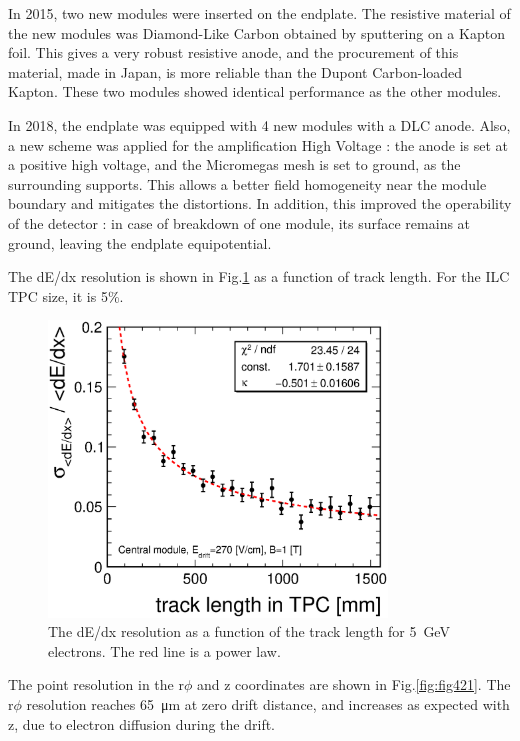 In 2015, two new modules were inserted on the endplate. The resistive material of the new
modules was Diamond-Like Carbon obtained by sputtering on a Kapton foil.
This gives a very robust resistive anode, and the procurement of this material, made in Japan, is more reliable
than the Dupont Carbon-loaded Kapton. These two modules showed identical performance as the other modules.

In 2018, the endplate was equipped with 4 new modules with a DLC anode. Also, a new scheme was applied for the amplification High Voltage : the anode is set at a positive high voltage, and the Micromegas mesh is set to ground, as the surrounding supports. This allows a better field homogeneity near the module boundary and mitigates the distortions. In addition, this improved the operability of the detector : in case of breakdown of one module, its surface remains at ground, leaving the endplate equipotential. 

The dE/dx resolution is shown in Fig.\ref{fig:fig440} as a function of track length. For the ILC TPC size, it is 5\%.
\begin{figure}
\centering
\includegraphics[width=90mm]{Tracker/TPC_Bonn/plots/fig200116_dEdx_modCanvSize.eps}
\caption{The dE/dx resolution as a function of the track length for \SI{5}{GeV} electrons. The red line is a power law.}
\label{fig:fig440}
\end{figure}
The point resolution in the r$\phi$ and z coordinates are shown in Fig.\ref{fig:fig421}. The r$\phi$ resolution reaches \SI{65}{\micro\meter} at zero drift distance, and increases as expected with z, due to electron diffusion during the drift.

